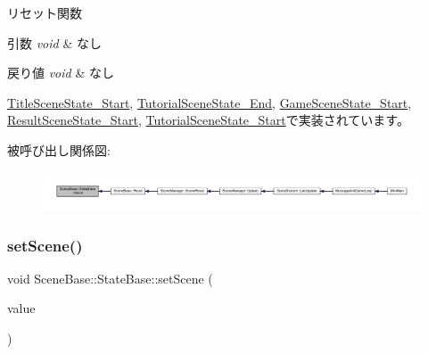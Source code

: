 リセット関数 


\begin{DoxyParams}{引数}
{\em void} & なし \\
\hline
\end{DoxyParams}

\begin{DoxyRetVals}{戻り値}
{\em void} & なし \\
\hline
\end{DoxyRetVals}


\mbox{\hyperlink{class_title_scene_state___start_af4dfe902a4391ca8f0cff5d1aa9507f8}{Title\+Scene\+State\+\_\+\+Start}}, \mbox{\hyperlink{class_tutorial_scene_state___end_ada1a87235a021b40f8eca96e31879227}{Tutorial\+Scene\+State\+\_\+\+End}}, \mbox{\hyperlink{class_game_scene_state___start_a59270f7b65613f580864ed8ea3056179}{Game\+Scene\+State\+\_\+\+Start}}, \mbox{\hyperlink{class_result_scene_state___start_a8f776a7b2d31451c434fb74ffdd65960}{Result\+Scene\+State\+\_\+\+Start}}, \mbox{\hyperlink{class_tutorial_scene_state___start_a40bfdf7acd93b619138bf708adff31e4}{Tutorial\+Scene\+State\+\_\+\+Start}}で実装されています。

被呼び出し関係図\+:
\nopagebreak
\begin{figure}[H]
\begin{center}
\leavevmode
\includegraphics[width=350pt]{class_scene_base_1_1_state_base_a2e14a3afece0b1d8db9edcebf514a977_icgraph}
\end{center}
\end{figure}
\mbox{\label{class_scene_base_1_1_state_base_adfb19da59b938832387aa10528bedb44}} 
\subsubsection{\texorpdfstring{set\+Scene()}{setScene()}}
{\footnotesize\ttfamily void Scene\+Base\+::\+State\+Base\+::set\+Scene (\begin{DoxyParamCaption}\item[{\mbox{\hyperlink{class_scene_base}{Scene\+Base}} $\ast$}]{value }\end{DoxyParamCaption})\hspace{0.3cm}{\ttfamily [inline]}}




